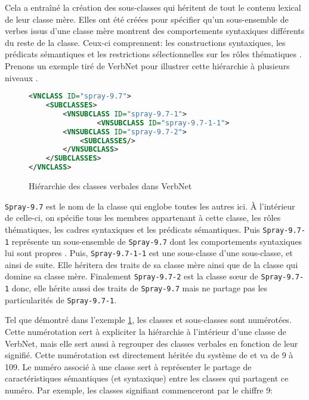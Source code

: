 Cela a entraîné la création des sous-classes qui héritent de tout le contenu lexical de leur classe mère. Elles ont été créées pour spécifier qu'un sous-ensemble de verbes issus d'une classe mère montrent des comportements syntaxiques différents du reste de la classe. Ceux-ci comprennent: les constructions syntaxiques, les prédicats sémantiques et les restrictions sélectionnelles sur les rôles thématiques \citep{SchulerVerbnetBroadcoverageComprehensive2005}. Prenons un exemple tiré de VerbNet pour illustrer cette hiérarchie à plusieurs niveaux \citep{CLEARVerbNetAnnotationGuidelines2005}.

\begin{figure}[htb]
  \caption{Hiérarchie des classes verbales dans VerbNet}
	\label{hierarch}
\begin{lstlisting}[language=XML]
<VNCLASS ID="spray-9.7">
    <SUBCLASSES>
        <VNSUBCLASS ID="spray-9.7-1">
                <VNSUBCLASS ID="spray-9.7-1-1">
        <VNSUBCLASS ID="spray-9.7-2">
            <SUBCLASSES/>
        </VNSUBCLASS>
    </SUBCLASSES>
</VNCLASS>
\end{lstlisting}
\end{figure}

\texttt{Spray-9.7} est le nom de la classe qui englobe toutes les autres ici. À l'intérieur de celle-ci, on spécifie tous les membres appartenant à cette classe, les rôles thématiques, les cadres syntaxiques et les prédicats sémantiques. Puis \texttt{Spray-9.7-1} représente un sous-ensemble de \texttt{Spray-9.7} dont les comportements syntaxiques lui sont propres .  Puis, \texttt{Spray-9.7-1-1} est une sous-classe d'une sous-classe, et ainsi de suite. Elle héritera des traits de sa classe mère ainsi que de la classe qui domine sa classe mère. Finalement \texttt{Spray-9.7-2} est la classe sœur de \texttt{Spray-9.7-1} donc, elle hérite aussi des traits de \texttt{Spray-9.7} mais ne partage pas les particularités de \texttt{Spray-9.7-1}.

Tel que démontré dans l'exemple \ref{hierarch}, les classes et sous-classes sont numérotées. Cette numérotation sert à expliciter la hiérarchie à l'intérieur d'une classe de VerbNet, mais elle sert aussi à regrouper des classes verbales en fonction de leur signifié. Cette numérotation est directement héritée du système de \cite{verb-classes.levin.1993} et va de 9 à 109. Le numéro associé à une classe sert à représenter le partage de caractéristiques sémantiques (et syntaxique) entre les classes qui partagent ce numéro. Par exemple, les classes signifiant  commenceront par le chiffre 9:


